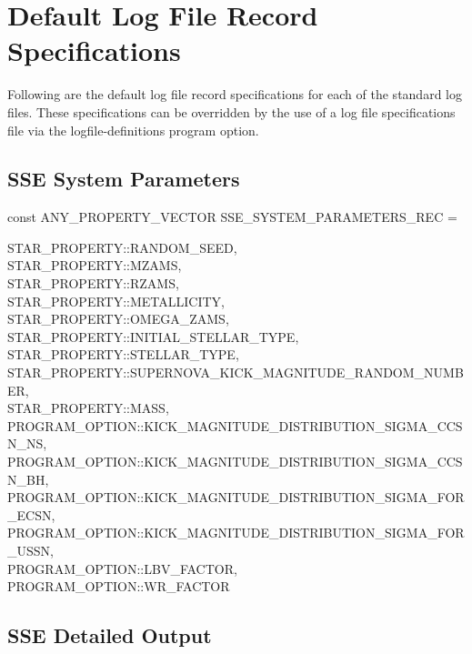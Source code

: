 \newpage
\section{Default Log File Record Specifications}\label{sec:DefaultLogFileRecordSpecs}

Following are the default log file record specifications for each of the standard log files.  These specifications can be overridden by the use of a log file specifications file via the logfile-definitions program option.


\subsection{SSE System Parameters}\label{sec:SSESystemParameters}

const ANY\_PROPERTY\_VECTOR SSE\_SYSTEM\_PARAMETERS\_REC = \lcb

\hfill
\begin{minipage}{\dimexpr\textwidth-2em}
    STAR\_PROPERTY::RANDOM\_SEED, \\
    STAR\_PROPERTY::MZAMS, \\
    STAR\_PROPERTY::RZAMS, \\
    STAR\_PROPERTY::METALLICITY, \\
    STAR\_PROPERTY::OMEGA\_ZAMS, \\
    STAR\_PROPERTY::INITIAL\_STELLAR\_TYPE, \\
    STAR\_PROPERTY::STELLAR\_TYPE, \\
    STAR\_PROPERTY::SUPERNOVA\_KICK\_MAGNITUDE\_RANDOM\_NUMBER, \\
    STAR\_PROPERTY::MASS, \\
    PROGRAM\_OPTION::KICK\_MAGNITUDE\_DISTRIBUTION\_SIGMA\_CCSN\_NS, \\
    PROGRAM\_OPTION::KICK\_MAGNITUDE\_DISTRIBUTION\_SIGMA\_CCSN\_BH, \\
    PROGRAM\_OPTION::KICK\_MAGNITUDE\_DISTRIBUTION\_SIGMA\_FOR\_ECSN, \\
    PROGRAM\_OPTION::KICK\_MAGNITUDE\_DISTRIBUTION\_SIGMA\_FOR\_USSN, \\
    PROGRAM\_OPTION::LBV\_FACTOR, \\
    PROGRAM\_OPTION::WR\_FACTOR
\end{minipage}
\par\rcb{;}

\newpage
\subsection{SSE Detailed Output}\label{sec:SSEParameters}

